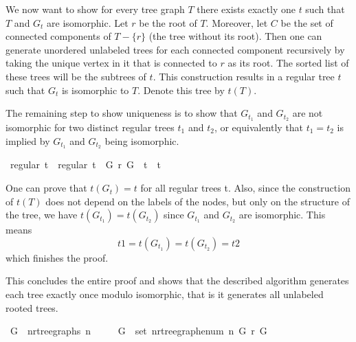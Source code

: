 We now want to show for every tree graph $T$ there exists exactly one $t$ such that $T$ and $G_t$ are isomorphic.
Let $r$ be the root of $T$.
Moreover, let $C$ be the set of connected components of $T - \{r\}$ (the tree without its root). 
Then one can generate unordered unlabeled trees for each connected component recursively by taking the unique vertex in it that is connected to $r$ as its root.
The sorted list of these trees will be the subtrees of $t$.
This construction results in a regular tree $t$ such that $G_t$ is isomorphic to $T$.
Denote this tree by $t(T)$.

The remaining step to show uniqueness is to show that $G_{t_1}$ and $G_{t_2}$ are not isomorphic for two distinct regular trees $t_1$ and $t_2$, or equivalently that $t_1 = t_2$ is implied by $G_{t_1}$ and $G_{t_2}$ being isomorphic.
\begin{isabellebox}
    \isamarkupfalse%
    {\kern0pt}\ {\isachardoublequoteopen}regular\ t{}\ {\isasymLongrightarrow}\ regular\ t{}\ {\isasymLongrightarrow}\ G\ {\isasymsimeq}\isactrlsub r\ G\ {\isasymLongrightarrow}\ t{}\ {\isacharequal}{\kern0pt}\ t{}{\isachardoublequoteclose}
\end{isabellebox}
One can prove that $t(G_t) = t$ for all regular trees t.
Also, since the construction of $t(T)$ does not depend on the labels of the nodes, but only on the structure of the tree, we have $t(G_{t_1}) = t(G_{t_2})$ since $G_{t_1}$ and $G_{t_2}$ are isomorphic.
This means
\[
    t1 = t(G_{t_1}) = t(G_{t_2}) = t2
\]
which finishes the proof.

This concludes the entire proof and shows that the described algorithm generates each tree exactly once modulo isomorphic, that is it generates all unlabeled rooted trees.

\begin{isabellebox}
    \isamarkupfalse%
    \ {\isachardoublequoteopen}G\ {\isasymin}\ n{\isacharunderscore}{\kern0pt}rtree{\isacharunderscore}{\kern0pt}graphs\ n\isanewline
    \ \ \ \ {\isasymLongrightarrow}\ {\isasymexists}{\isacharbang}{\kern0pt}G{\isacharprime}{\kern0pt}\ {\isasymin}\ set\ {\isacharparenleft}{\kern0pt}n{\isacharunderscore}{\kern0pt}rtree{\isacharunderscore}{\kern0pt}graph{\isacharunderscore}{\kern0pt}enum\ n{\isacharparenright}{\kern0pt}{\isachardot}{\kern0pt}\ G{\isacharprime}{\kern0pt}\ {\isasymsimeq}\isactrlsub r\ G{\isachardoublequoteclose}
\end{isabellebox}
